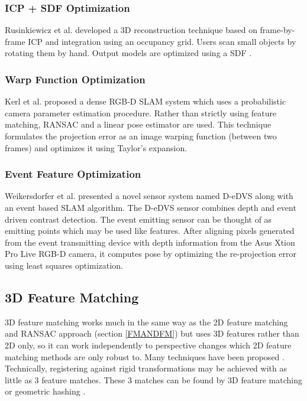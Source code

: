 \subsubsection{ICP + SDF Optimization}

Rusinkiewicz et al. \cite{Rusinkiewicz02Real} developed a 3D reconstruction technique based on frame-by-frame ICP and integration using an occupancy grid. Users scan small objects by rotating them by hand. Output models are optimized using a SDF \cite{Curless96Volumetric}.


\subsubsection{Warp Function Optimization} 

Kerl et al. \cite{Kerl13Dense} proposed a dense RGB-D SLAM system which uses a probabilistic camera parameter estimation procedure. Rather than strictly using feature matching, RANSAC and a linear pose estimator are used. This technique formulates the projection error as an image warping function (between two frames) and optimizes it using Taylor's expansion.

\subsubsection{Event Feature Optimization}

Weikersdorfer et al. \cite{Weikersdorfer14Event} presented a novel sensor system named D-eDVS along with an event based SLAM algorithm. The D-eDVS sensor combines depth and event driven contrast detection. The event emitting sensor can be thought of as emitting points which may be used like features. After aligning pixels generated from the event transmitting device with depth information from the Asus Xtion Pro Live RGB-D camera, it computes pose by optimizing the re-projection error using least squares optimization.


\subsection{3D Feature Matching}
\label{Sec:3DFMMethod}

3D feature matching works much in the same way as the 2D feature matching and RANSAC approach (section \ref{FMANDFM}) but uses 3D features rather than 2D only, so it can work independently to perspective changes which 2D feature matching methods are only robust to. Many techniques have been proposed \cite{Scovanner073Dimensional,Flitton10Object,Li05Multiscale}. Technically, registering against rigid transformations may be achieved with as little as 3 feature matches. These 3 matches can be found by 3D feature matching or geometric hashing \cite{Wolfson97Geometric}.



